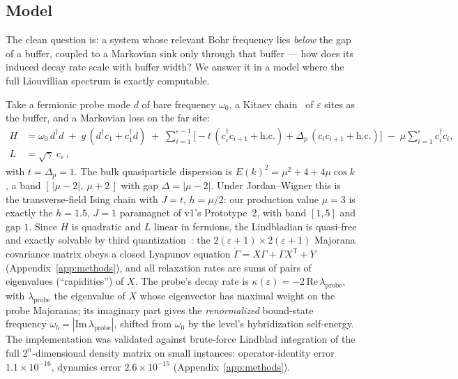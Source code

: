 \documentclass[11pt,a4paper]{article}
\theoremstyle{remark}
\newcommand{\eps}{\varepsilon}
\begin{document}
\subsection{Model}

The clean question is: a system whose relevant Bohr frequency lies \emph{below} the gap of
a buffer, coupled to a Markovian sink only through that buffer --- how does its induced
decay rate scale with buffer width? We answer it in a model where the full Liouvillian
spectrum is exactly computable.

Take a fermionic probe mode $d$ of bare frequency $\omega_0$, a Kitaev
chain~\cite{Kitaev2001} of $\eps$ sites as the buffer, and a Markovian loss on the far
site:
\begin{align}
  H &= \omega_0\, d^\dagger d \;+\; g\,(d^\dagger c_1 + c_1^\dagger d)
      \;+\; \sum_{i=1}^{\eps-1}\Big[-t\,(c_i^\dagger c_{i+1} + \mathrm{h.c.})
      + \Delta_p\,(c_i c_{i+1} + \mathrm{h.c.})\Big]
      \;-\; \mu \sum_{i=1}^{\eps} c_i^\dagger c_i , \nonumber\\
  L &= \sqrt{\gamma}\; c_{\eps}\,,
  \label{eq:model}
\end{align}
with $t=\Delta_p=1$. The bulk quasiparticle dispersion is
$E(k)^2 = \mu^2 + 4 + 4\mu\cos k$, a band $[\,|\mu-2|,\ \mu+2\,]$ with gap
$\Delta = |\mu - 2|$. Under Jordan--Wigner this is the transverse-field Ising chain with
$J=t$, $h=\mu/2$: our production value $\mu=3$ is exactly the $h=1.5$, $J=1$ paramagnet of
v1's Prototype~2, with band $[1,5]$ and gap $1$. Since $H$ is quadratic and $L$ linear in
fermions, the Lindbladian is quasi-free and exactly solvable by third
quantization~\cite{Prosen2008,BarthelZhang2022}: the $2(\eps{+}1)\times 2(\eps{+}1)$
Majorana covariance matrix obeys a closed Lyapunov equation
$\dot\Gamma = X\Gamma + \Gamma X^{\mathsf T} + Y$
(Appendix~\ref{app:methods}), and all relaxation rates are sums of pairs of eigenvalues
(``rapidities'') of $X$. The probe's decay rate is
$\kappa(\eps) = -2\,\mathrm{Re}\,\lambda_{\mathrm{probe}}$, with
$\lambda_{\mathrm{probe}}$ the eigenvalue of $X$ whose eigenvector has maximal weight on
the probe Majoranas; its imaginary part gives the \emph{renormalized} bound-state frequency
$\omega_b = |\mathrm{Im}\,\lambda_{\mathrm{probe}}|$, shifted from $\omega_0$ by the
level's hybridization self-energy. The implementation was validated against brute-force
Lindblad integration of the full $2^{n}$-dimensional density matrix on small instances:
operator-identity error $1.1\times 10^{-16}$, dynamics error
$2.6\times 10^{-15}$ (Appendix~\ref{app:methods}).
\end{document}
